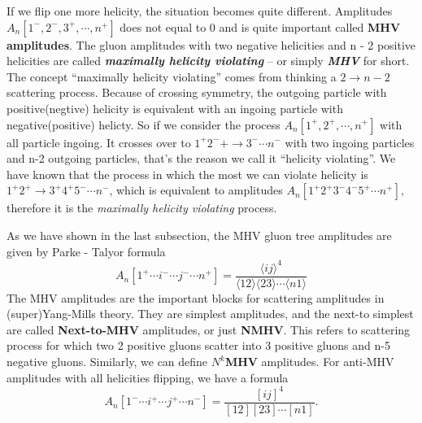 \documentclass[12pt]{article}
\numberwithin{equation}{section}
\newcommand{\mdavg}[2]{\langle #1 \rangle\!\langle #2 \rangle}
\newcommand{\avg}[1]{\langle #1 \rangle}
\newcommand{\tif}[1]{\textit{\textbf{#1}}}
\begin{document}
If we flip one more helicity, the situation becomes quite different. Amplitudes $A_n[1^-,2^-,3^+,\cdots,n^+]$ does not equal to 0 and is quite important called \textbf{MHV amplitudes}.
The gluon amplitudes with two negative helicities and n - 2 positive helicities are called
\tif{maximally helicity violating} – or simply \tif{MHV} for short. The concept ``maximally helicity violating'' comes from thinking a $2\rightarrow n-2$ scattering process. 
Because of crossing symmetry, the outgoing particle with positive(negtive) helicity is equivalent with an ingoing particle with negative(positive) helicty. So if we consider the process $A_n[1^+,2^+,\cdots,n^+]$ with 
all particle ingoing. It crosses over to $1^+2^-+\rightarrow 3^-\cdots n^-$ with two ingoing particles and n-2 outgoing particles, that's the reason we call it ``helicity violating''. We have known that the process in which the most we can violate helicity
is $1^+2^+\rightarrow 3^+4^+5^-\cdots n^-$, which is equivalent to amplitudes $A_n[1^+2^+3^-4^-5^+\cdots n^+]$, therefore it is the \textit{maximally helicity violating} process.

As we have shown in the last subsection, the MHV gluon tree amplitudes are given by Parke - Talyor formula
\begin{equation}
    A_n[1^+\cdots i^-\cdots j^- \cdots n^+]=\frac{\avg{ij}^4}{\mdavg{12}{23}\cdots\avg{n1}}
\end{equation}
The MHV amplitudes are the important blocks for scattering amplitudes in (super)Yang-Mills theory. They are simplest amplitudes, and the next-to simplest
are called \textbf{Next-to-MHV} amplitudes, or just \textbf{NMHV}. This refers to scattering process for which two 2 positive gluons scatter into 3 positive gluons and n-5 negative gluons. 
Similarly, we can define \textbf{$N^k$MHV} amplitudes. For anti-MHV amplitudes with all helicities flipping, we have a formula
\begin{equation}
    A_n[1^-\cdots i^+\cdots j^+ \cdots n^-]=\frac{[ij]^4}{[12][23]\cdots[n1]}.
\end{equation}
\end{document}
